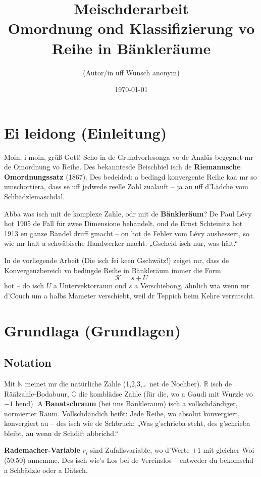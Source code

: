 \documentclass[12pt,a4paper]{scrbook}
\title{\textbf{Meischderarbeit}\\[0.5cm]
	Omordnung ond Klassifizierung vo Reihe in Bänkleräume}
\author{(Autor/in uff Wunsch anonym)}
\date{\today}
\begin{document}
	
	\maketitle
	\tableofcontents
	
	\chapter{Ei leidong (Einleitung)}
	Moin, i moin, grüß Gott! Scho in de Grundvorlesonga vo de Analüs begegnet mr de Omordnung vo Reihe. Des bekanntesde Beischbiel isch de \textbf{Riemannsche Omordnungssatz} (1867). Des bedeided: a bedingd konvergente Reihe kaa mr so umschortiera, dass se uff jedwede reelle Zahl zualauft – ja au uff d’Lädche vom Schbädzlemaschdal.
	
	Abba was isch mit de komplexe Zahle, odr mit de \textbf{Bänkleräum}? De Paul Lévy hot 1905 de Fall für zwee Dimensione behandelt, ond de Ernst Schteinitz hot 1913 en ganze Bändel druff gmacht – on hot de Fehler vom Lévy ausbessert, so wie mr halt a schwäbische Handwerker macht: „Gscheid isch nur, was hält.“
	
	In de vorliegende Arbeit (Die isch fei keen Gschwätz!) zeiget mr, dass de Konvergenzbereich vo bedingde Reihe in Bänkleräum immer die Form 
	\[
	\mathcal{K} = s + U
	\]
	hot – do isch \(U\) a Untervektorraum ond \(s\) a Verschiebong, ähnlich wia wenn mr d’Couch um a halbs Mameter verschiebt, weil dr Teppich beim Kehre verrutscht.
	
	\chapter{Grundlaga (Grundlagen)}
	\section{Notation}
	Mit \(\mathbb{N}\) meinet mr die natürliche Zahle (1,2,3,… net de Nochber). \(\mathbb{R}\) isch de Räälzahle-Bodabuur, \(\mathbb{C}\) die komblädse Zahle (für die, wo a Gaudi mit Wurzle vo \(-1\) hend). A \textbf{Banatschraum} (bei uns Bänkleraum) isch a vollschdändiger, normierter Raum. Vollschdändich heißt: Jede Reihe, wo absolut konvergiert, konvergiert au – des isch wie de Schbruch: „Was g’schrieba steht, des g’schrieba bleibt, au wenn dr Schdift abbrichd.“
	
	\textbf{Rademacher-Variable} \(r_i\) sind Zufallsvariable, wo d’Werte \(\pm1\) mit gleicher Woi (50:50) annemme. Des isch wie’s Los bei de Vereinslos – entweder du bekomschd a Schbädzle oder a Dätsch.
	
\end{document}
